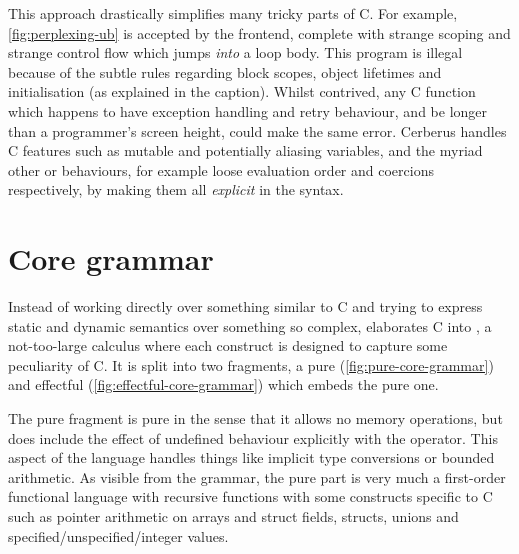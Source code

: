 This approach drastically simplifies many tricky parts of C. For example,
\cref{fig:perplexing-ub} is accepted by the frontend, complete with strange
scoping and strange control flow which jumps \emph{into} a loop body. This
program is illegal because of the subtle rules regarding block scopes, object
lifetimes and initialisation (as explained in the caption). Whilst contrived,
any C function which happens to have exception handling and retry behaviour,
and be longer than a programmer's screen height, could make the same error.
Cerberus handles C features such as mutable and potentially aliasing variables,
and the myriad other  or  behaviours, for
example loose evaluation order and coercions respectively, by making them all
\emph{explicit} in the syntax.

\begin{marginfigure}
    \caption{Example of subtle scoping and control-flow issues leading to UB
        (courtesy~\cite[p70]{memarian2022cerberus}).
        Jumping to  starts the lifetime of an object, but does not
        initialise it. Jumping to  then \emph{ends that lifetime}
        because it exits the block (lines 5\textendash{}12). By the time
        execution reaches line 8,  \emph{refers to a dead object}.
        This is why the seemingly redundant re-assignment of 
        on line 7 would prevent UB in this example.}\label{fig:perplexing-ub}
\end{marginfigure}

\section{Core grammar}

Instead of working directly over something similar to C and trying to express
static and dynamic semantics over something so complex, 
elaborates C into , a not-too-large calculus where each construct
is designed to capture some peculiarity of C. It is split into two fragments, a
pure (\cref{fig:pure-core-grammar}) and effectful
(\cref{fig:effectful-core-grammar}) which embeds the pure one.

The pure fragment is pure in the sense that it allows no memory operations, but does
include the effect of undefined behaviour explicitly with the
 operator. This aspect of the language handles %
things like implicit type conversions or bounded arithmetic. As visible from the
grammar, the pure part is very much a first-order functional language with
recursive functions with some constructs specific to C such as pointer
arithmetic on arrays and struct fields, structs, unions and
specified/unspecified/integer values.

